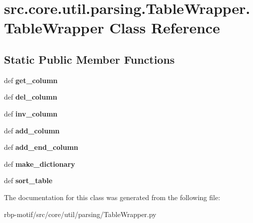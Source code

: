 \hypertarget{classsrc_1_1core_1_1util_1_1parsing_1_1TableWrapper_1_1TableWrapper}{\section{src.\-core.\-util.\-parsing.\-Table\-Wrapper.\-Table\-Wrapper Class Reference}
\label{classsrc_1_1core_1_1util_1_1parsing_1_1TableWrapper_1_1TableWrapper}
}
\subsection*{Static Public Member Functions}
\begin{DoxyCompactItemize}
\item 
\hypertarget{classsrc_1_1core_1_1util_1_1parsing_1_1TableWrapper_1_1TableWrapper_a7f206df02bfb33174a05cf00f90e7e0c}{def {\bfseries get\-\_\-column}}\label{classsrc_1_1core_1_1util_1_1parsing_1_1TableWrapper_1_1TableWrapper_a7f206df02bfb33174a05cf00f90e7e0c}

\item 
\hypertarget{classsrc_1_1core_1_1util_1_1parsing_1_1TableWrapper_1_1TableWrapper_a90a82424d399e381751d95a63bdc688e}{def {\bfseries del\-\_\-column}}\label{classsrc_1_1core_1_1util_1_1parsing_1_1TableWrapper_1_1TableWrapper_a90a82424d399e381751d95a63bdc688e}

\item 
\hypertarget{classsrc_1_1core_1_1util_1_1parsing_1_1TableWrapper_1_1TableWrapper_a65dc1be0d53997410dd7830504febc8b}{def {\bfseries inv\-\_\-column}}\label{classsrc_1_1core_1_1util_1_1parsing_1_1TableWrapper_1_1TableWrapper_a65dc1be0d53997410dd7830504febc8b}

\item 
\hypertarget{classsrc_1_1core_1_1util_1_1parsing_1_1TableWrapper_1_1TableWrapper_a195ce8621713fda1c21f886616d9bc93}{def {\bfseries add\-\_\-column}}\label{classsrc_1_1core_1_1util_1_1parsing_1_1TableWrapper_1_1TableWrapper_a195ce8621713fda1c21f886616d9bc93}

\item 
\hypertarget{classsrc_1_1core_1_1util_1_1parsing_1_1TableWrapper_1_1TableWrapper_ac2fe7c6327aa467b31de4e46b2709d40}{def {\bfseries add\-\_\-end\-\_\-column}}\label{classsrc_1_1core_1_1util_1_1parsing_1_1TableWrapper_1_1TableWrapper_ac2fe7c6327aa467b31de4e46b2709d40}

\item 
\hypertarget{classsrc_1_1core_1_1util_1_1parsing_1_1TableWrapper_1_1TableWrapper_a57c2f693f74d91792cecc0740539acfa}{def {\bfseries make\-\_\-dictionary}}\label{classsrc_1_1core_1_1util_1_1parsing_1_1TableWrapper_1_1TableWrapper_a57c2f693f74d91792cecc0740539acfa}

\item 
\hypertarget{classsrc_1_1core_1_1util_1_1parsing_1_1TableWrapper_1_1TableWrapper_acc33beb49bf093f6e5f963a7b800a43e}{def {\bfseries sort\-\_\-table}}\label{classsrc_1_1core_1_1util_1_1parsing_1_1TableWrapper_1_1TableWrapper_acc33beb49bf093f6e5f963a7b800a43e}

\end{DoxyCompactItemize}


The documentation for this class was generated from the following file\-:\begin{DoxyCompactItemize}
\item 
rbp-\/motif/src/core/util/parsing/Table\-Wrapper.\-py\end{DoxyCompactItemize}
